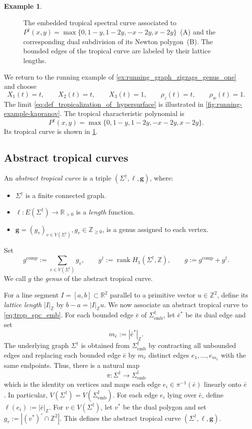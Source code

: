 \documentclass[12pt]{amsart}
\numberwithin{equation}{section}
\theoremstyle{definition}
\newtheorem{example}[theorem]{Example}
\newcommand{\Z}{\mathbb{Z}}
\newcommand{\R}{\mathbb{R}}
\def\vertices{V}
\def\edges{E}
\def\Rpos{\R_{>0}}
\def\trop{\dagger}
\def\mcurve{\Sigma}
\def\tropmcurve{\mcurve^\trop}
\begin{document}
\begin{example}
\begin{figure}
\caption{
The embedded tropical spectral curve associated to
$
P^\trop(x,y)
=
\max\{0,1-y,1-2y,-x-2y,x-2y\}
$~(A) and the corresponding dual subdivision of its Newton polygon~(B).
The bounded edges of the tropical curve are labeled by their lattice
lengths.
}
\label{fig:running-example-tropical-spectral-curve}

\end{figure}


We return to the running example of
\cref{ex:running_graph_zigzags_genus_one} and choose
\[
X_1(t)=t,\qquad
X_2(t)=t,\qquad
X_3(t)=1,\qquad
\rho_z(t)=t,\qquad
\rho_w(t)=1.
\]
The limit \eqref{eq:def_tropicalization_of_hypersurface} is illustrated in \cref{fig:running-example-kapranov}. The tropical characteristic polynomial is
\[
P^\trop(x,y)
=
\max
\{
0,
1-y,
1-2y,
-x-2y,
x-2y
\}.
\]
Its tropical curve is shown in \cref{fig:running-example-tropical-spectral-curve}. 
\end{example}


\subsection{Abstract tropical curves}\label{sec:abst_trop_curve}

An \emph{abstract tropical curve} is a triple
$(\tropmcurve,\ell,\bm g)$, where:
\begin{itemize}
\item $\tropmcurve$ is a finite connected graph.
\item $\ell:\edges(\tropmcurve)\to\Rpos$ is a \emph{length} function.
\item $\bm g=(g_v)_{v\in\vertices(\tropmcurve)}, g_v \in \Z_{\geq 0}$, is a genus assigned to each vertex.
\end{itemize}

Set
\[
g^{\mathrm{comp}}
:=
\sum_{v\in\vertices(\tropmcurve)}g_v,
\qquad
g^\trop
:=
\operatorname{rank}H_1(\tropmcurve,\Z),
\qquad
g
:=
g^{\mathrm{comp}}+g^\trop.
\]
We call $g$ the \emph{genus} of the abstract tropical curve.

For a line segment $I=[a,b]\subset\R^2$ parallel to a primitive
vector $u\in\Z^2$, define its \emph{lattice length} $|I|_{\Z}$ by
$
b-a=|I|_{\Z}u.
$ We now associate an abstract tropical curve to
\eqref{eq:trop_spc_emb}. For each bounded edge $\bar e$ of
$\tropmcurve_{\mathrm{emb}}$, let $\bar e^*$ be its dual edge and set
\[
m_{\bar e}
:=
|\bar e^*|_{\Z}.
\]
The underlying graph $\tropmcurve$ is obtained from
$\tropmcurve_{\mathrm{emb}}$ by contracting all unbounded edges and
replacing each bounded edge $\bar e$ by $m_{\bar e}$ distinct edges
$
e_1,\dots,e_{m_{\bar e}}
$
with the same endpoints. Thus, there is a natural map
\[
\pi:
\tropmcurve
\rightarrow
\tropmcurve_{\mathrm{emb}}
\]
which is the identity on vertices and maps each edge
$e_i\in\pi^{-1}(\bar e)$ linearly onto $\bar e$. In particular,
$
\vertices(\tropmcurve)
=
\vertices(\tropmcurve_{\mathrm{emb}}).
$ For each edge $e_i$ lying over $\bar e$, define
$
\ell(e_i)
:=
|\bar e|_{\Z}.
$
For $v\in\vertices(\tropmcurve)$, let $v^*$ be the dual polygon and set
$
g_v
:=
\left|
(v^*)^\circ\cap\Z^2
\right|.
$
This defines the abstract tropical curve
$
(\tropmcurve,\ell,\bm g).
$
\end{document}
